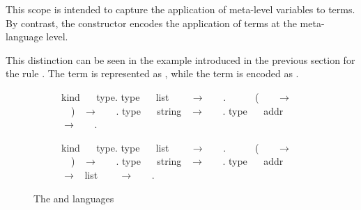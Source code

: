 This scope is intended to capture the application of meta-level variables to
terms. By contrast, the constructor \mapp encodes the application of
\Fo{} terms at the meta-language level.

This distinction can be seen in the example introduced in the previous section
for the rule . The term  is represented as
, while the term 
is encoded as
\eI{~\mapp~ [Q, p]}.


\begin{figure}
  \begin{subfigure}{0.47\textwidth}
    \begin{elpicode}
      kind ~\otm~ type.
      type ~\oapp~ list ~\otm~ ~$\to$~ ~\otm~.
      ~~ ~\olam~ (~\otm~ ~$\to$~ ~\otm~) ~$\to$~ ~\otm~.
      type ~\ocon~ string ~$\to$~ ~\otm~.
      type ~\ouva~ addr ~$\to$~ ~\otm~.
    \end{elpicode}
  \end{subfigure}
  \begin{subfigure}{0.47\textwidth}
    \begin{elpicode}
      kind ~\mtm~  type.
      type ~\mapp~ list ~\mtm~ ~$\to$~ ~\mtm~.
      ~~ ~\mlam~ (~\mtm~ ~$\to$~ ~\mtm~) ~$\to$~ ~\mtm~.
      type ~\mcon~ string ~$\to$~ ~\mtm~.
      type ~\muva~ addr ~$\to$~ list ~\mtm~ ~$\to$~ ~\mtm~.
    \end{elpicode}
  \end{subfigure}
  \caption{The \Fo{} and \Ho languages}\vspace{0.3em}
  \label{code:common-terms}
\end{figure}

